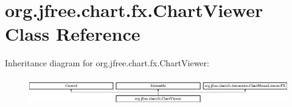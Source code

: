 \hypertarget{classorg_1_1jfree_1_1chart_1_1fx_1_1_chart_viewer}{}\section{org.\+jfree.\+chart.\+fx.\+Chart\+Viewer Class Reference}
\label{classorg_1_1jfree_1_1chart_1_1fx_1_1_chart_viewer}
Inheritance diagram for org.\+jfree.\+chart.\+fx.\+Chart\+Viewer\+:\begin{figure}[H]
\begin{center}
\leavevmode
\includegraphics[height=1.188960cm]{classorg_1_1jfree_1_1chart_1_1fx_1_1_chart_viewer}
\end{center}
\end{figure}
